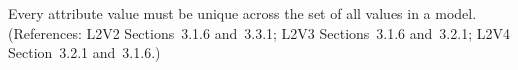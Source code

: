Every  attribute value must be unique across the set of all
 values in a model.  (References: L2V2 Sections~3.1.6 and~3.3.1;
L2V3 Sections~3.1.6 and~3.2.1; L2V4 Section~3.2.1 and~3.1.6.)
